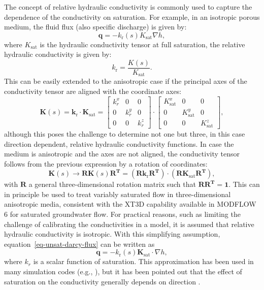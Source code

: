 \documentclass[fleqn]{article}
\begin{document}
The concept of relative hydraulic conductivity is commonly used to 
capture the dependence of the conductivity on saturation. For example, 
in an isotropic porous medium, the fluid flux (also specific discharge)
is given by:
\begin{equation}
  \mathbf{q} = - k_\textrm{r}(s) K_{\textrm{sat}} \nabla h,
\end{equation}
where $K_\textrm{sat}$ is the hydraulic conductivity tensor at full saturation,
the relative hydraulic conductivity is given by:
\begin{equation}
  k_\textrm{r} = \frac{K(s)}{K_{\textrm{sat}}}.
\end{equation}
This can be easily extended to the anisotropic case if the principal axes
of the conductivity tensor are aligned with the coordinate axes:
\begin{equation}
  \mathbf{K}(s) = \mathbf{k}_{\textrm{r}} \cdot \mathbf{K}_{\textrm{sat}}
  = 
  \begin{bmatrix}
    k_r^x & 0     & 0     \\
    0     & k_r^y & 0     \\
    0     & 0     & k_r^z
  \end{bmatrix} \cdot
  \begin{bmatrix}
    K_{\text{sat}}^x & 0                & 0                \\
    0                & K_{\text{sat}}^y & 0                \\
    0                & 0                & K_{\text{sat}}^z
  \end{bmatrix},
\end{equation}
although this poses the challenge to determine not one but three, in
this case direction dependent, relative hydraulic conductivity functions. In case the 
medium is anisotropic and the axes are not aligned, the conductivity tensor
follows from the previous expression by a rotation of coordinates:
\begin{equation}
  \mathbf{K}(s) \rightarrow \mathbf{R} \mathbf{K}(s) \mathbf{R^T}
  = (\mathbf{R} \mathbf{k}_{\textrm{r}} \mathbf{R^T}) \cdot 
  (\mathbf{R} \mathbf{K}_{\textrm{sat}} \mathbf{R^T}),
\end{equation}
with $\mathbf{R}$ a general three-dimensional rotation matrix such that
$\mathbf{R}\mathbf{R^T} = \mathbf{1}$. This can in principle be used
to treat variably saturated flow in three-dimensional anisotropic media,
consistent with the XT3D capability \cite{modflow6xt3d} available in
MODFLOW 6 for saturated groundwater flow. For practical reasons, such
as limiting the challenge of calibrating the conductivities in a model,
it is assumed that relative hydraulic conductivity is isotropic. With this
simplifying assumption, equation~\ref{eq-unsat-darcy-flux} can be written as
\begin{equation}
  \mathbf{q} = - k_\text{r}(s) \mathbf{K}_{\textrm{sat}} \cdot \nabla h,
\end{equation}
where $k_r$ is a scalar function of saturation. This approximation
has been used in many simulation codes 
(e.g., \cite{vs2d,modflowvsf,vosssutra,panday-surfact}), but it has been
pointed out that the effect of saturation on the conductivity generally 
depends on direction \cite{bear-1987}.
\end{document}
